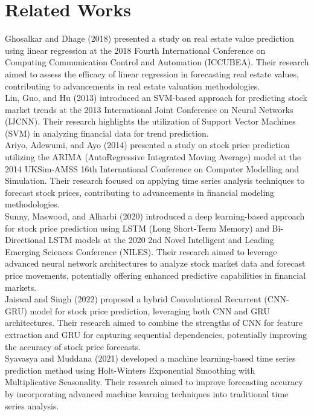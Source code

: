 \documentclass{ieeeojies}
\begin{document}
	\section{Related Works}
	Ghosalkar and Dhage (2018) \cite{b1} presented a study on real estate value prediction using linear regression at the 2018 Fourth International Conference on Computing Communication Control and Automation (ICCUBEA). Their research aimed to assess the efficacy of linear regression in forecasting real estate values, contributing to advancements in real estate valuation methodologies. \\
	Lin, Guo, and Hu (2013) \cite{b2} introduced an SVM-based approach for predicting stock market trends at the 2013 International Joint Conference on Neural Networks (IJCNN). Their research highlights the utilization of Support Vector Machines (SVM) in analyzing financial data for trend prediction. \\
	Ariyo, Adewumi, and Ayo (2014) \cite{b3} presented a study on stock price prediction utilizing the ARIMA (AutoRegressive Integrated Moving Average) model at the 2014 UKSim-AMSS 16th International Conference on Computer Modelling and Simulation. Their research focused on applying time series analysis techniques to forecast stock prices, contributing to advancements in financial modeling methodologies. \\
	Sunny, Maswood, and Alharbi (2020) \cite{b4} introduced a deep learning-based approach for stock price prediction using LSTM (Long Short-Term Memory) and Bi-Directional LSTM models at the 2020 2nd Novel Intelligent and Leading Emerging Sciences Conference (NILES). Their research aimed to leverage advanced neural network architectures to analyze stock market data and forecast price movements, potentially offering enhanced predictive capabilities in financial markets. \\
	Jaiswal and Singh (2022) \cite{b5} proposed a hybrid Convolutional Recurrent (CNN-GRU) model for stock price prediction, leveraging both CNN and GRU architectures. Their research aimed to combine the strengths of CNN for feature extraction and GRU for capturing sequential dependencies, potentially improving the accuracy of stock price forecasts. \\
	Syavasya and Muddana (2021) \cite{b6} developed a machine learning-based time series prediction method using Holt-Winters Exponential Smoothing with Multiplicative Seasonality. Their research aimed to improve forecasting accuracy by incorporating advanced machine learning techniques into traditional time series analysis. 
\end{document}

